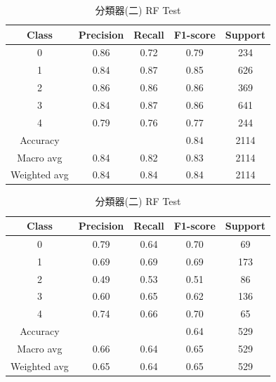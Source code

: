 \begin{enumerate}
\begin{enumerate}
                \begin{table}[H]
                \centering
                \scriptsize
                \begin{minipage}{0.48\textwidth}
                \centering
                \begin{tabular}{c|cccc}
                \hline
                Class & Precision & Recall & F1-score & Support \\
                \hline
                0 & 0.86 & 0.72 & 0.79 & 234 \\
                1 & 0.84 & 0.87 & 0.85 & 626 \\
                2 & 0.86 & 0.86 & 0.86 & 369 \\
                3 & 0.84 & 0.87 & 0.86 & 641 \\
                4 & 0.79 & 0.76 & 0.77 & 244 \\
                \hline
                Accuracy &       &       & 0.84 & 2114 \\
                Macro avg & 0.84 & 0.82 & 0.83 & 2114 \\
                Weighted avg & 0.84 & 0.84 & 0.84 & 2114 \\
                \hline
                \end{tabular}
                \caption{分類器(二) RF Train}
                \label{tab:classifier_2_report_train_rf_rf_non_filtered}
                \end{minipage}%
                \hfill
                \begin{minipage}{0.48\textwidth}
                \centering
                \begin{tabular}{c|cccc}
                \hline
                Class & Precision & Recall & F1-score & Support \\
                \hline
                0 & 0.79 & 0.64 & 0.70 & 69 \\
                1 & 0.69 & 0.69 & 0.69 & 173 \\
                2 & 0.49 & 0.53 & 0.51 & 86 \\
                3 & 0.60 & 0.65 & 0.62 & 136 \\
                4 & 0.74 & 0.66 & 0.70 & 65 \\
                \hline
                Accuracy &       &       & 0.64 & 529 \\
                Macro avg & 0.66 & 0.64 & 0.65 & 529 \\
                Weighted avg & 0.65 & 0.64 & 0.65 & 529 \\
                \hline
                \end{tabular}
                \caption{分類器(二) RF Test}
                \label{tab:classifier_2_report_train_rf_rf_non_filtered}
                \end{minipage}
                \end{table}



\end{enumerate}
\end{enumerate}

